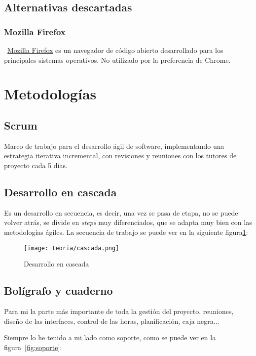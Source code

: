 \subsection{Alternativas descartadas}

\subsubsection{Mozilla Firefox}\label{mozilla}
~\href{https://www.mozilla.org/es-ES/firefox/new/}{Mozilla Firefox} es un navegador de código abierto desarrollado para los principales sistemas operativos. No utilizado por la preferencia de Chrome.

\section{Metodologías}

\subsection{Scrum}
Marco de trabajo para el desarrollo ágil de software, implementando una estrategia iterativa incremental, con revisiones y reuniones con los tutores de proyecto cada 5 días.

\subsection{Desarrollo en cascada}
Es un desarrollo en secuencia, es decir, una vez se pasa de etapa, no se puede volver atrás, se divide en \emph{steps} muy diferenciados, que se adapta muy bien con las metodologías ágiles. La secuencia de trabajo se puede ver en la siguiente figura\ref{fig:cascada}:

\begin{figure}[H]
	\centering
	\texttt{[image: teoria/cascada.png]}
	\caption{Desarrollo en cascada}\label{fig:cascada}
\end{figure}

\subsection{Bolígrafo y cuaderno}
Para mi la parte más importante de toda la gestión del proyecto, reuniones, diseño de las interfaces, control de las horas, planificación, caja negra... 

Siempre lo he tenido a mi lado como soporte, como se puede ver en la figura~\ref{fig:soporte}:

